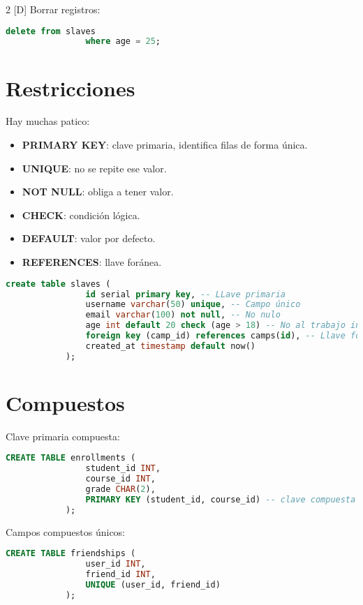 \documentclass{article}
\begin{document}
\begin{multicols}{2}
		[D] Borrar registros:
		\noindent
		\begin{lstlisting}[language=sql]
			delete from slaves
				where age = 25;
		\end{lstlisting}
		
		\section{Restricciones}
		
		Hay muchas patico:
		
		\begin{itemize}
			\item \textbf{PRIMARY KEY}: clave primaria, identifica filas de forma única.
			\item \textbf{UNIQUE}: no se repite ese valor.
			\item \textbf{NOT NULL}: obliga a tener valor.
			\item \textbf{CHECK}: condición lógica.
			\item \textbf{DEFAULT}: valor por defecto.
			\item \textbf{REFERENCES}: llave foránea.
		\end{itemize}
		
		\begin{lstlisting}[language=sql]
			create table slaves (
				id serial primary key, -- LLave primaria
				username varchar(50) unique, -- Campo único
				email varchar(100) not null, -- No nulo
				age int default 20 check (age > 18) -- No al trabajo infantil
				foreign key (camp_id) references camps(id), -- Llave foranea
				created_at timestamp default now()
			);
		\end{lstlisting}
		
		\section{Compuestos}
		
		Clave primaria compuesta:
		
		\begin{lstlisting}[language=sql]
			CREATE TABLE enrollments (
				student_id INT,
				course_id INT,
				grade CHAR(2),
				PRIMARY KEY (student_id, course_id) -- clave compuesta
			);
		\end{lstlisting}
		
		Campos compuestos únicos:
		
		\begin{lstlisting}[language=sql]
			CREATE TABLE friendships (
				user_id INT,
				friend_id INT,
				UNIQUE (user_id, friend_id)
			);
		\end{lstlisting}
		

\end{multicols}
\end{document}
